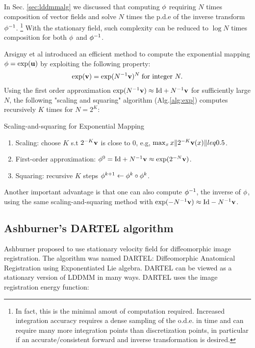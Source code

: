 \documentclass[letterpaper,12pt]{article}
\begin{document}
In Sec. \ref{sec:lddmmalg} we discussed that computing $\phi$
requiring $N$ times composition of vector fields and solve $N$ times
the p.d.e of the inverse transform $\phi^{-1}$. \footnote{In fact,
  this is the minimal amout of computation required.  Increased
  integration accuracy requires a dense sampling of the o.d.e. in time
  and can require many more integration points than discretization
  points, in particular if an accurate/consistent forward and inverse
  transformation is desired.}  With the stationary field, such complexity can be reduced to $\log N$ times composition for both $\phi$ and $\phi^{-1}$. 

Arsigny et al \cite{Arsigny2006} introduced an efficient method to compute the exponential mapping $\phi = \exp(\mathbf{u})$ by exploiting the following property:
\begin{align}
\exp(\mathbf{v}) = \exp(N^{-1} \mathbf{v} )^N \;\text{for integer } N.
\end{align}
Using the first order approximation $\exp(N^{-1} \mathbf{v}) \approx \text{Id} + N^{-1}\mathbf{v}$ for sufficiently large $N$, the following "scaling and squaring" algorithm (Alg.\ref{alg:exp}) computes recursively $K$ times for $N = 2^K$:
\begin{algorithm}
\caption{Scaling-and-squaring for Exponential Mapping}
\label{alg:exp}
\begin{enumerate}
\item{Scaling: choose $K$ s.t $2^{-K}\mathbf{v}$ is close to 0, e.g, $\max_x x\|2^{-K}\mathbf{v}(x)\| leq 0.5 $. 
}
\item{First-order approximation: $\phi^{0} =  \text{Id} + N^{-1}\mathbf{v} \approx \exp(2^{-N} \mathbf{v}) $.
}
\item{Squaring: recursive $K$ steps $\phi^{k+1} \leftarrow \phi^{k} \circ \phi^{k}$. 
}
\end{enumerate}
\end{algorithm}

Another important advantage is that one can also compute $\phi^{-1}$, the inverse of $\phi$, using the same scaling-and-squaring method with $\exp(-N^{-1} \mathbf{v}) \approx \text{Id} - N^{-1}\mathbf{v}$. 


\subsection{Ashburner's DARTEL algorithm}

Ashburner proposed to use stationary velocity field for diffeomorphic image registration. The algorithm was named DARTEL: Diffeomorphic Anatomical Registration using Exponentiated Lie algebra. DARTEL can be viewed as a stationary version of LDDMM in many ways. DARTEL uses the image registration energy
 function:
\end{document}
